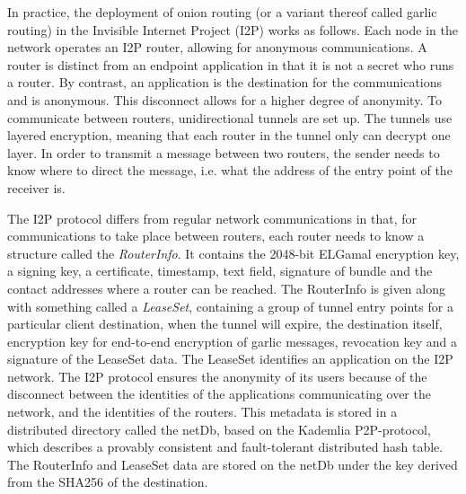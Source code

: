 In practice, the deployment of onion routing (or a variant thereof called garlic routing) in the Invisible Internet Project (I2P) works as follows. Each node in the network operates an I2P router, allowing for anonymous communications. A router is distinct from an endpoint application in that it is not a secret who runs a router. By contrast, an application is the destination for the communications and is anonymous.  This disconnect allows for a higher degree of anonymity. To communicate between routers, unidirectional tunnels are set up. The tunnels use layered encryption, meaning that each router in the tunnel only can decrypt one layer. In order to transmit a message between two routers, the sender needs to know  where to direct the message, i.e. what the address of the entry point of the receiver is. 

The I2P protocol differs from regular network communications in that, for communications to take place between routers, each router needs to know a structure called the \textit{RouterInfo}. It contains the 2048-bit ELGamal encryption key, a signing key, a certificate, timestamp, text field, signature of bundle and the contact addresses where a router can be reached. The RouterInfo is given along with something called a \textit{LeaseSet}, containing a group of tunnel entry points for a particular client destination, when the tunnel will expire, the destination itself, encryption key for end-to-end encryption of garlic messages, revocation key and a signature of the LeaseSet data. The LeaseSet identifies an application on the I2P network. The I2P protocol ensures the anonymity of its users because of the disconnect between the identities of the applications communicating over the network, and the identities of the routers. This metadata is stored in a distributed directory called the netDb, based on the Kademlia P2P-protocol, which describes a provably consistent and fault-tolerant distributed hash table. \cite{kademlia} The RouterInfo and LeaseSet data are stored on the netDb under the key derived from the SHA256 of the destination.


